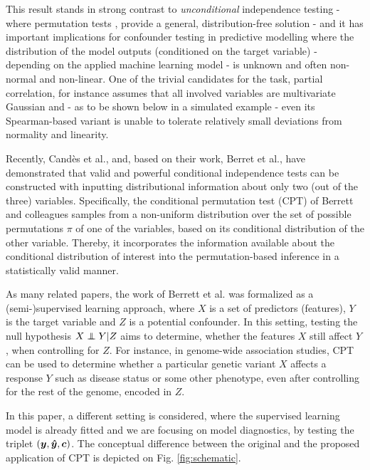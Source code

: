 \documentclass{article}
\begin{document}
This result stands in strong contrast to \emph{unconditional} independence testing - where permutation tests \citep{pitman1937significance, fisher1942189}, provide a general, distribution-free solution - and it has important implications for confounder testing in predictive modelling where the distribution of the model outputs (conditioned on the target variable) - depending on the applied machine learning model - is unknown and often non-normal and non-linear. One of the trivial candidates for the task, partial correlation, for instance assumes that all involved variables are multivariate Gaussian and - as to be shown below in a simulated example - even its Spearman-based variant is unable to tolerate relatively small deviations from normality and linearity.

Recently, Cand\`es et al.\cite{candes2016panning}, and, based on their work, Berret et al.\cite{berrett2020conditional}, have demonstrated that valid and powerful conditional independence tests can be constructed with inputting distributional information about only two (out of the three) variables.
Specifically, the conditional permutation test (CPT) of Berrett and colleagues samples from a non-uniform distribution over the set of possible permutations $\pi$ of one of the variables, based on its conditional distribution of the other variable. Thereby, it incorporates the information available about the conditional distribution of interest into the permutation-based inference in a statistically valid manner.

As many related papers, the work of Berrett et al. was formalized as a (semi-)supervised learning approach, where $X$ is a set of predictors (features), $Y$ is the target variable and $Z$ is a potential confounder. In this setting, testing the null hypothesis $X \independent Y | Z$ aims to determine, whether the features $X$ still affect $Y$, when controlling for $Z$.
For instance, in genome-wide association studies, CPT can be used to determine whether a particular genetic variant $X$ affects a response $Y$ such as disease status or some other phenotype, even after controlling for the rest of the genome, encoded in $Z$.

In this paper, a different setting is considered, where the supervised learning model is already fitted and we are focusing on model diagnostics, by testing the triplet $(\boldsymbol{y},\boldsymbol{\hat{y}}, \boldsymbol{c})$. 
The conceptual difference between the original and the proposed application of CPT is depicted on Fig. \ref{fig:schematic}.
\end{document}
